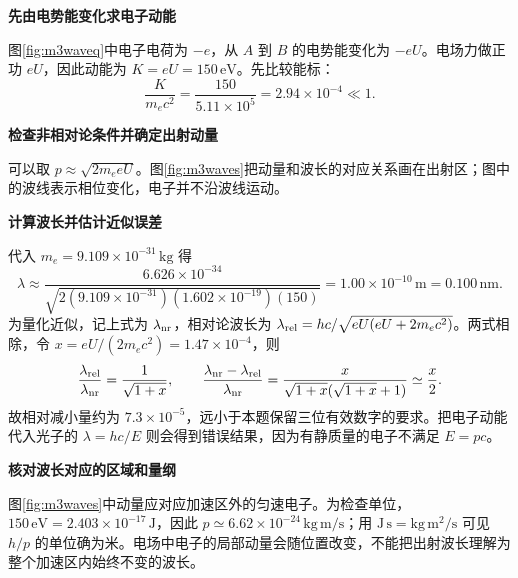 \begin{solution}\textbf{先由电势能变化求电子动能}\par\nobreak
图\ref{fig:m3waveq}中电子电荷为 \(-e\)，从 \(A\) 到 \(B\) 的电势能变化为 \(-eU\)。电场力做正功 \(eU\)，因此动能为 \(K=eU=150\,\mathrm{eV}\)。先比较能标：
\[
 \frac{K}{m_ec^2}=\frac{150}{5.11\times10^5}=2.94\times10^{-4}\ll1.
\]


\par\medskip{}\noindent\textbf{检查非相对论条件并确定出射动量}\par\nobreak
可以取 \(p\approx\sqrt{2m_e eU}\)。图\ref{fig:m3waves}把动量和波长的对应关系画在出射区；图中的波线表示相位变化，电子并不沿波线运动。



\par\medskip{}\noindent\textbf{计算波长并估计近似误差}\par\nobreak
代入 \(m_e=9.109\times10^{-31}\,\mathrm{kg}\) 得
\[
 \lambda\approx\frac{6.626\times10^{-34}}
 {\sqrt{2(9.109\times10^{-31})(1.602\times10^{-19})(150)}}
 =\boxed{1.00\times10^{-10}\,\mathrm m=0.100\,\mathrm{nm}}.
\]
为量化近似，记上式为 $\lambda_{\rm nr}$，相对论波长为 $\lambda_{\rm rel}=hc/\sqrt{eU(eU+2m_ec^2)}$。两式相除，令 $x=eU/(2m_ec^2)=1.47\times10^{-4}$，则
\[
 \frac{\lambda_{\rm rel}}{\lambda_{\rm nr}}=\frac1{\sqrt{1+x}},\qquad
 \frac{\lambda_{\rm nr}-\lambda_{\rm rel}}{\lambda_{\rm nr}}
 =\frac{x}{\sqrt{1+x}(\sqrt{1+x}+1)}\simeq\frac x2.
\]
故相对减小量约为 \(7.3\times10^{-5}\)，远小于本题保留三位有效数字的要求。把电子动能代入光子的 \(\lambda=hc/E\) 则会得到错误结果，因为有静质量的电子不满足 \(E=pc\)。



\par\medskip{}\noindent\textbf{核对波长对应的区域和量纲}\par\nobreak
图\ref{fig:m3waves}中动量应对应加速区外的匀速电子。为检查单位，\(150\,\mathrm{eV}=2.403\times10^{-17}\,\mathrm J\)，因此
\(p\simeq6.62\times10^{-24}\,\mathrm{kg\,m/s}\)；用 \(\mathrm{J\,s}=\mathrm{kg\,m^2/s}\) 可见 \(h/p\) 的单位确为米。电场中电子的局部动量会随位置改变，不能把出射波长理解为整个加速区内始终不变的波长。
\end{solution}

